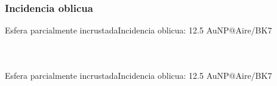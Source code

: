    \subsubsection{Incidencia oblicua}
      \begin{frame}{Esfera parcialmente incrustada}{Incidencia oblicua: 12.5 AuNP$@$Aire/BK7}
      \vspace{-3.5em}\begin{columns}\scriptsize
      \renewcommand{\newcirc}{{\scaleobj{.85}{\circ}}}
      	\begin{table} \end{table}%
      \renewcommand{\newcirc}{{\scaleobj{.625}{\circ}}}
      \begin{figure}\centering\fontsize{4}{5}\selectfont
          \def\svgwidth{.9\textwidth}
      \end{figure}
      \end{columns}
      \end{frame}
      \begin{frame}{Esfera parcialmente incrustada}{Incidencia oblicua: 12.5 AuNP$@$Aire/BK7}
      \vspace{-3.5em}\begin{columns}\scriptsize
      \renewcommand{\newcirc}{{\scaleobj{.85}{\circ}}}
      	\begin{table} \end{table}%
      \renewcommand{\newcirc}{{\scaleobj{.625}{\circ}}}
      \begin{figure}\centering\fontsize{4}{5}\selectfont
          \def\svgwidth{.9\textwidth}
      \end{figure}
      \end{columns}
      \end{frame}
